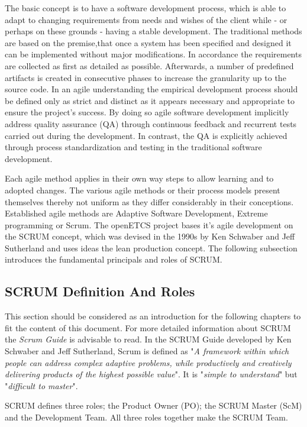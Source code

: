The basic concept is to have a software development process, which is able to adapt to changing requirements from needs and wishes of the client while - or perhaps on these grounds - having a stable development. The traditional methods are based on the premise,that once a system has been specified and designed it can be implemented without major modifications. In accordance the requirements are collected as first as detailed as possible. Afterwards, a number of predefined artifacts is created in consecutive phases to increase the granularity up to the source code. In an agile understanding the empirical development process should be defined only as strict and distinct as it appears necessary and appropriate to ensure the project's success. By doing so agile software development implicitly address quality assurance (QA) through  continuous feedback and recurrent tests carried out during the development. In contrast, the QA is explicitly achieved through process standardization and testing in the traditional software development.

Each agile method applies in their own way steps to allow learning and to adopted changes. The various agile methods or their process models present themselves thereby not uniform as they differ considerably in their conceptions. Established agile methods are Adaptive Software Development, Extreme programming or Scrum. The openETCS project bases it's agile development on the SCRUM concept, which was devised in the 1990s by Ken Schwaber and Jeff Sutherland and uses ideas the lean production concept. The following subsection introduces the fundamental principals and roles of SCRUM.


\subsection{SCRUM Definition And Roles}

This section should be considered as an introduction for the following chapters to fit the content of this document. For more detailed information about SCRUM the \textit{Scrum Guide} is advisable to read. In the SCRUM Guide developed by Ken Schwaber and Jeff Sutherland, Scrum is defined as "\textit{A framework within which people can address complex adaptive problems, while productively and creatively delivering products of the highest possible value}". It is "\textit{simple to understand}" but "\textit{difficult to master}".

SCRUM defines three roles; the Product Owner (PO); the SCRUM Master (ScM) and the Development Team. All three roles together make the SCRUM Team.

